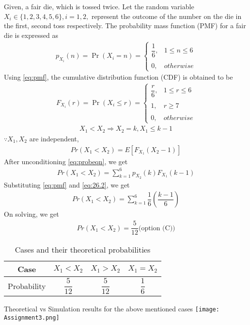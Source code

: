 \documentclass[journal,12pt,twocolumn]{IEEEtran}
\begin{document}
Given, a fair die, which is tossed twice. Let the random variable $X_{i}\in\{1,2,3,4,5,6\},i=1,2,$ represent the outcome of the number on the die in the first, second toss respectively.  
\newline\newline
The probability  mass function (PMF) for a fair die is expressed as \begin{align}
    \tag{26.1}
    \label{eq:pmf}
    p_{X_{i}}(n)=\Pr(X_{i}=n) = 
	\begin{cases}
	\dfrac{1}{6}, & 1\leq n\leq6 \\~\\[-1em]
	0, & otherwise
	\end{cases}
\end{align}
Using \eqref{eq:pmf}, the cumulative distribution function (CDF) is obtained to be
\begin{align}
    \tag{26.2}
    F_{X_{i}}(r)=\Pr(X_{i}\leq r) = 
	\begin{cases}
	\dfrac{r}{6}, & 1\leq r\leq6 \\~\\[-1em]
	1, & r \geq 7 \\~\\[-1em]
	0, & otherwise
	\end{cases}
	\label{eq:26.2}
\end{align}
\begin{align}
    \tag{26.3}
    X_{1}<X_{2}\Rightarrow X_{2}=k,X_{1}\leq k-1
\end{align}
$\because X_{1},X_{2}$ are independent,
\begin{align}
    \tag{26.4}
    Pr(X_{1}<X_{2})=E\left[F_{X_{1}}(X_{2}-1)\right]
    \label{eq:probeqn}
\end{align}
After unconditioning \eqref{eq:probeqn}, we get
\begin{align}
    \tag{26.5}
    Pr(X_{1}<X_{2})=\sum_{k=1}^{6}p_{X_{2}}(k) F_{X_{1}}(k-1)
\end{align}
Substituting \eqref{eq:pmf} and \eqref{eq:26.2}, we get
\begin{align}
    \tag{26.6}
    Pr(X_{1}<X_{2})=\sum_{k=1}^{6}\dfrac{1}{6}\left(\dfrac{k-1}{6} \right)
\end{align}
On solving, we get
\begin{align}
    \tag{26.7}
    Pr(X_{1}<X_{2})=\dfrac{5}{12}\text{(option (C))}
\end{align}
\begin{table}[h!]
\centering
\caption{Cases and their theoretical probabilities}
\label{table:1}
\begin{tabular}{|c||c|c|c|}
    \hline
    Case & $X_{1}<X_{2}$& $X_{1}>X_{2}$& $X_{1}=X_{2}$ \\
    \hline
    Probability & $\dfrac{5}{12}$ & $\dfrac{5}{12}$ & $\dfrac{1}{6}$\\[1ex]
    \hline
\end{tabular}
\end{table}
\newline
Theoretical vs Simulation results for the above mentioned cases
\centering
\texttt{[image: Assignment3.png]}
\end{document}
